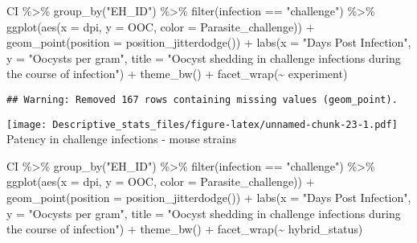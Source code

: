\documentclass[
]{article}
\newenvironment{Shaded}{\begin{snugshade}}{\end{snugshade}}
\newcommand{\AttributeTok}[1]{\textcolor[rgb]{0.77,0.63,0.00}{#1}}
\newcommand{\FunctionTok}[1]{\textcolor[rgb]{0.00,0.00,0.00}{#1}}
\newcommand{\NormalTok}[1]{#1}
\newcommand{\SpecialCharTok}[1]{\textcolor[rgb]{0.00,0.00,0.00}{#1}}
\newcommand{\StringTok}[1]{\textcolor[rgb]{0.31,0.60,0.02}{#1}}
\begin{document}
\begin{Shaded}
\begin{Highlighting}[]
\NormalTok{CI }\SpecialCharTok{\%\textgreater{}\%}
  \FunctionTok{group\_by}\NormalTok{(}\StringTok{"EH\_ID"}\NormalTok{) }\SpecialCharTok{\%\textgreater{}\%}
  \FunctionTok{filter}\NormalTok{(infection }\SpecialCharTok{==} \StringTok{"challenge"}\NormalTok{) }\SpecialCharTok{\%\textgreater{}\%}
  \FunctionTok{ggplot}\NormalTok{(}\FunctionTok{aes}\NormalTok{(}\AttributeTok{x =}\NormalTok{ dpi, }\AttributeTok{y =}\NormalTok{ OOC, }\AttributeTok{color =}\NormalTok{ Parasite\_challenge)) }\SpecialCharTok{+}
  \FunctionTok{geom\_point}\NormalTok{(}\AttributeTok{position =} \FunctionTok{position\_jitterdodge}\NormalTok{()) }\SpecialCharTok{+}
  \FunctionTok{labs}\NormalTok{(}\AttributeTok{x =} \StringTok{"Days Post Infection"}\NormalTok{, }\AttributeTok{y =} \StringTok{"Oocysts per gram"}\NormalTok{,}
       \AttributeTok{title =} \StringTok{"Oocyst shedding in challenge infections during the }
\StringTok{       course of infection"}\NormalTok{) }\SpecialCharTok{+}
    \FunctionTok{theme\_bw}\NormalTok{() }\SpecialCharTok{+}
    \FunctionTok{facet\_wrap}\NormalTok{(}\SpecialCharTok{\textasciitilde{}}\NormalTok{ experiment)}
\end{Highlighting}
\end{Shaded}

\begin{verbatim}
## Warning: Removed 167 rows containing missing values (geom_point).
\end{verbatim}

\texttt{[image: Descriptive\_stats\_files/figure-latex/unnamed-chunk-23-1.pdf]}
Patency in challenge infections - mouse strains

\begin{Shaded}
\begin{Highlighting}[]
\NormalTok{CI }\SpecialCharTok{\%\textgreater{}\%}
  \FunctionTok{group\_by}\NormalTok{(}\StringTok{"EH\_ID"}\NormalTok{) }\SpecialCharTok{\%\textgreater{}\%}
  \FunctionTok{filter}\NormalTok{(infection }\SpecialCharTok{==} \StringTok{"challenge"}\NormalTok{) }\SpecialCharTok{\%\textgreater{}\%}
  \FunctionTok{ggplot}\NormalTok{(}\FunctionTok{aes}\NormalTok{(}\AttributeTok{x =}\NormalTok{ dpi, }\AttributeTok{y =}\NormalTok{ OOC, }\AttributeTok{color =}\NormalTok{ Parasite\_challenge)) }\SpecialCharTok{+}
  \FunctionTok{geom\_point}\NormalTok{(}\AttributeTok{position =} \FunctionTok{position\_jitterdodge}\NormalTok{()) }\SpecialCharTok{+}
  \FunctionTok{labs}\NormalTok{(}\AttributeTok{x =} \StringTok{"Days Post Infection"}\NormalTok{, }\AttributeTok{y =} \StringTok{"Oocysts per gram"}\NormalTok{,}
       \AttributeTok{title =} \StringTok{"Oocyst shedding in challenge infections during the }
\StringTok{       course of infection"}\NormalTok{) }\SpecialCharTok{+}
    \FunctionTok{theme\_bw}\NormalTok{() }\SpecialCharTok{+}
    \FunctionTok{facet\_wrap}\NormalTok{(}\SpecialCharTok{\textasciitilde{}}\NormalTok{ hybrid\_status)}
\end{Highlighting}
\end{Shaded}
\end{document}
